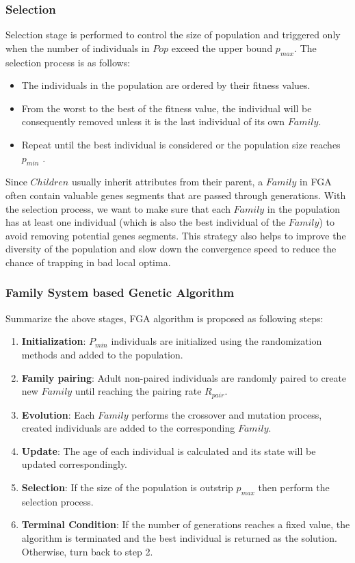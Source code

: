 \documentclass[final]{elsarticle}
\begin{document}
\subsubsection{Selection}

Selection stage is performed to control the size of population and triggered only when the number of individuals in $Pop$ exceed the upper bound $p_{max}$. The selection process is as follows: 
\begin{itemize}
	\item The individuals in the population are ordered by their fitness values. 
	\item From the worst to the best of the fitness value, the individual will be consequently removed unless it is the last individual of its own $ Family $. 
	\item Repeat until the best individual is considered or the population size reaches $p_{min}$ .
\end{itemize}
Since $Children$ usually inherit attributes from their parent, a $Family$ in FGA often contain valuable genes segments that are passed through generations. With the selection process, we want to make sure that each $ Family $ in the population has at least one individual (which is also the best individual of the $ Family $) to avoid removing potential genes segments. This strategy also helps to improve the diversity of the population and slow down the convergence speed to reduce the chance of trapping in bad local optima.

\subsubsection{Family System based Genetic Algorithm}

Summarize the above stages, FGA algorithm is proposed as following steps:

\begin{enumerate}
	\item \textbf{Initialization}: $P_{min}$ individuals are initialized using the randomization methods and added to the population.
	\item \textbf{Family pairing}: Adult non-paired individuals are randomly paired to create new $ Family $ until reaching the pairing rate $R_{pair}$.
	\item \textbf{Evolution}: Each $ Family $ performs the crossover and mutation process, created individuals are added to the corresponding $ Family $.
	\item \textbf{Update}: The age of each individual is calculated and its state will be updated correspondingly.
	\item \textbf{Selection}: If the size of the population is outstrip $p_{max}$ then perform the selection process.
	\item \textbf{Terminal Condition}: If the number of generations reaches a fixed value, the algorithm is terminated and the best individual is returned as the solution. Otherwise, turn back to step 2.
\end{enumerate}
\end{document}
